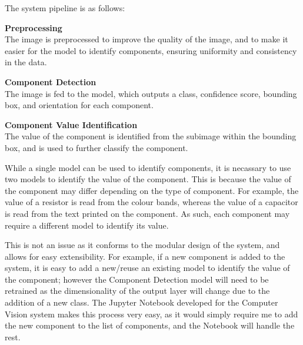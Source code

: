 The system pipeline is as follows:
\begin{mylist}
    \item \textbf{Preprocessing} \\
    The image is preprocessed to improve the quality of the image, and to make it easier for the model to identify components, ensuring
    uniformity and consistency in the data.
    \item \textbf{Component Detection} \\
    The image is fed to the model, which outputs a class, confidence score, bounding box, and orientation for each component.
    \item \textbf{Component Value Identification} \\
    The value of the component is identified from the subimage within the bounding box, and is used to further classify the component.
\end{mylist}

While a single model can be used to identify components, it is necassary to use two models to identify the value of the component.
This is because the value of the component may differ depending on the type of component. For example, the value of a resistor
is read from the colour bands, whereas the value of a capacitor is read from the text printed on the component. As such, each
component may require a different model to identify its value.

This is not an issue as it conforms to the modular design of the system, and allows for easy extensibility. For example, if
a new component is added to the system, it is easy to add a new/reuse an existing model to identify the value of the component; however the 
Component Detection model will need to be retrained as the dimensionality of the output layer will change due to the addition
of a new class. The Jupyter Notebook developed for the Computer Vision system makes this process very easy, as it would simply
require me to add the new component to the list of components, and the Notebook will handle the rest. 
